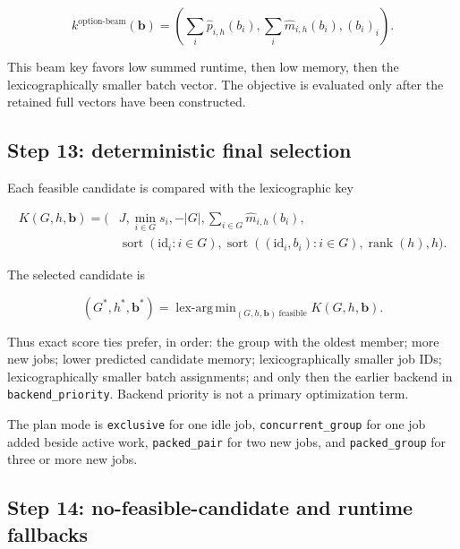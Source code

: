 \documentclass[11pt]{article}
\newcommand{\code}[1]{\textcolor{codeblue}{\texttt{#1}}}
\newcommand{\argminlex}{\mathop{\mathrm{lex\mbox{-}arg\,min}}}
\begin{document}
\begin{equation}
  k^{\mathrm{option\mbox{-}beam}}(\boldsymbol b)
  =\left(
     \sum_i\widehat p_{i,h}(b_i),
     \sum_i\widehat m_{i,h}(b_i),
     (b_i)_i
   \right).
  \label{eq:option-beam}
\end{equation}

This beam key favors low summed runtime, then low memory, then the
lexicographically smaller batch vector.  The objective is evaluated only after
the retained full vectors have been constructed.

\subsection{Step 13: deterministic final selection}

Each feasible candidate is compared with the lexicographic key

\begin{equation}
\begin{split}
  K(G,h,\boldsymbol b)=\big(&J,
    \min_{i\in G}s_i,
    -|G|,
    \sum_{i\in G}\widehat m_{i,h}(b_i),\\
    &\operatorname{sort}(\mathrm{id}_i:i\in G),
    \operatorname{sort}((\mathrm{id}_i,b_i):i\in G),
    \operatorname{rank}(h),h\big).
  \label{eq:tie-key}
\end{split}
\end{equation}

The selected candidate is

\begin{equation}
  (G^*,h^*,\boldsymbol b^*)
  =\argminlex_{(G,h,\boldsymbol b)\ \mathrm{feasible}}
     K(G,h,\boldsymbol b).
  \label{eq:final-choice}
\end{equation}

Thus exact score ties prefer, in order: the group with the oldest member; more
new jobs; lower predicted candidate memory; lexicographically smaller job IDs;
lexicographically smaller batch assignments; and only then the earlier backend
in \code{backend\_priority}.  Backend priority is not a primary optimization
term.

The plan mode is \code{exclusive} for one idle job,
\code{concurrent\_group} for one job added beside active work,
\code{packed\_pair} for two new jobs, and \code{packed\_group} for three or more
new jobs.

\subsection{Step 14: no-feasible-candidate and runtime fallbacks}
\end{document}
